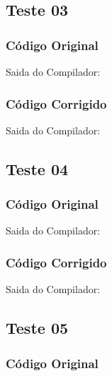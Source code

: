 \subsection{Teste 03}
\label{subsec:semanticoTeste03}

\subsubsection{Código Original}


Saida do Compilador:




\subsubsection{Código Corrigido}


Saida do Compilador:




\subsection{Teste 04}
\label{subsec:semanticoTeste04}

\subsubsection{Código Original}


Saida do Compilador:




\subsubsection{Código Corrigido}


Saida do Compilador:




\subsection{Teste 05}
\label{subsec:semanticoTeste05}

\subsubsection{Código Original}


